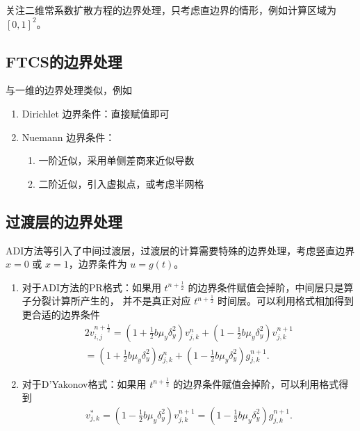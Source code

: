 关注二维常系数扩散方程的边界处理，只考虑直边界的情形，例如计算区域为 $[0,1]^2$。

\subsection*{FTCS的边界处理}

与一维的边界处理类似，例如
\begin{enumerate}
    \item Dirichlet 边界条件：直接赋值即可
    \item Nuemann 边界条件：
          \begin{enumerate}
              \item 一阶近似，采用单侧差商来近似导数
              \item 二阶近似，引入虚拟点，或考虑半网格
          \end{enumerate}
\end{enumerate}

\subsection*{过渡层的边界处理}

ADI方法等引入了中间过渡层，过渡层的计算需要特殊的边界处理，考虑竖直边界 $x=0$ 或 $x=1$，边界条件为 $u=g(t)$。

\begin{enumerate}
    \item 对于ADI方法的PR格式：如果用 $t^{n+\frac12}$ 的边界条件赋值会掉阶，中间层只是算子分裂计算所产生的，
          并不是真正对应 $t^{n+\frac12}$ 时间层。可以利用格式相加得到更合适的边界条件
          \begin{align*}
              2 v_{i,j}^{n+\frac12} =   \left(1+\frac12 b \mu_y \delta_y^2\right) v_{j,k}^{n}
              + \left(1-\frac12 b \mu_y \delta_y^2\right) v_{j,k}^{n+1}
              \\
              =   \left(1+\frac12 b \mu_y \delta_y^2\right) g_{j,k}^{n}
              + \left(1-\frac12 b \mu_y \delta_y^2\right) g_{j,k}^{n+1}.
          \end{align*}
    \item 对于D'Yakonov格式：如果用 $t^{n+\frac12}$ 的边界条件赋值会掉阶，可以利用格式得到
          \begin{align*}
              v_{j,k}^{*}   =    \left(1-\frac12 b \mu_y \delta_y^2 \right) v_{j,k}^{n+1}
              =  \left(1-\frac12 b \mu_y \delta_y^2 \right) g_{j,k}^{n+1}.
          \end{align*}
\end{enumerate}
